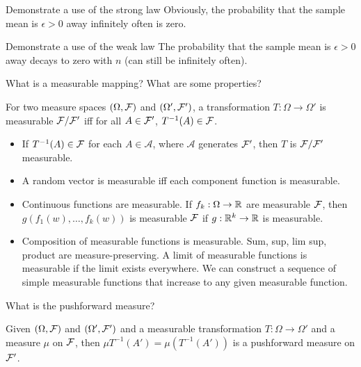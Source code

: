 \documentclass[avery5388,grid,frame]{flashcards}
\begin{document}
\begin{flashcard}
    {Demonstrate a use of the strong law}
    Obviously, the probability that the sample mean is $\epsilon > 0$ away infinitely often is zero.
\end{flashcard}


\begin{flashcard}
    {Demonstrate a use of the weak law}
    The probability that the sample mean is $\epsilon > 0$ away decays to zero with $n$ (can still be infinitely often).
\end{flashcard}


\begin{flashcard}
    {What is a measurable mapping? What are some properties?}
    \begin{definition}
        For two measure spaces $(\Omega, \mathcal F)$ and $(\Omega', \mathcal F')$, a transformation $T: \Omega \rightarrow \Omega'$ is measurable $\mathcal F / \mathcal F'$ iff for all $A \in \mathcal F'$, $T^{-1}(A) \in \mathcal F$.
    \end{definition}

    \begin{properties}
        \begin{itemize}
            \item If $T^{-1}(A) \in \mathcal F$ for each $A \in \mathcal A$, where $\mathcal A$ generates $\mathcal F'$, then $T$ is $\mathcal F / \mathcal F'$ measurable.
            \item A random vector is measurable iff each component function is measurable.
            \item Continuous functions are measurable. If $f_k: \Omega \rightarrow \mathbb{R}$ are measurable $\mathcal F$, then $g(f_1(w),\dots,f_k(w))$ is measurable $\mathcal F$ if $g: \mathbb{R}^k \rightarrow \mathbb{R}$ is measurable.
            \item Composition of measurable functions is measurable. Sum, sup, lim sup, product are measure-preserving. A limit of measurable functions is measurable if the limit exists everywhere. We can construct a sequence of simple measurable functions that increase to any given measurable function.
        \end{itemize}
    \end{properties}
\end{flashcard}


\begin{flashcard}
    {What is the pushforward measure?}
    \begin{definition}
        Given $(\Omega, \mathcal F)$ and $(\Omega',\mathcal F')$ and a measurable transformation $T:\Omega \rightarrow \Omega'$ and a measure $\mu$ on $\mathcal F$, then $\mu T^{-1}(A') = \mu (T^{-1}(A'))$ is a pushforward measure on $\mathcal F'$.
    \end{definition}
\end{flashcard}
\end{document}
